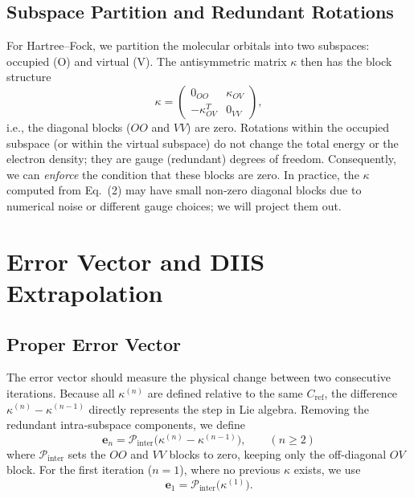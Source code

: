\documentclass[12pt,a4paper]{article}
\begin{document}
\subsection{Subspace Partition and Redundant Rotations}
For Hartree--Fock, we partition the molecular orbitals into two subspaces: occupied (O) and virtual (V). The antisymmetric matrix $\kappa$ then has the block structure
\[
\kappa = \begin{pmatrix}
0_{OO} & \kappa_{OV} \\
-\kappa_{OV}^T & 0_{VV}
\end{pmatrix},
\]
i.e., the diagonal blocks ($OO$ and $VV$) are zero. Rotations within the occupied subspace (or within the virtual subspace) do not change the total energy or the electron density; they are gauge (redundant) degrees of freedom. Consequently, we can \emph{enforce} the condition that these blocks are zero. In practice, the $\kappa$ computed from Eq.~(2) may have small non‑zero diagonal blocks due to numerical noise or different gauge choices; we will project them out.

\section{Error Vector and DIIS Extrapolation}

\subsection{Proper Error Vector}
The error vector should measure the physical change between two consecutive iterations. Because all $\kappa^{(n)}$ are defined relative to the same $C_{\text{ref}}$, the difference $\kappa^{(n)} - \kappa^{(n-1)}$ directly represents the step in Lie algebra. Removing the redundant intra‑subspace components, we define
\begin{equation}
\mathbf{e}_n = \mathcal{P}_{\text{inter}}\bigl(\kappa^{(n)} - \kappa^{(n-1)}\bigr), \qquad (n \ge 2)
\end{equation}
where $\mathcal{P}_{\text{inter}}$ sets the $OO$ and $VV$ blocks to zero, keeping only the off-diagonal $OV$ block. For the first iteration ($n=1$), where no previous $\kappa$ exists, we use
\begin{equation}
\mathbf{e}_1 = \mathcal{P}_{\text{inter}}\bigl(\kappa^{(1)}\bigr).
\end{equation}
\end{document}
